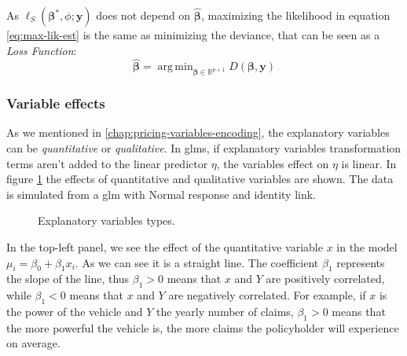 \documentclass[a4paper, twoside, openright, 12pt]{report}
\DeclareMathOperator*{\argmin}{arg\,min}  %
\theoremstyle{definition}
\theoremstyle{definition}
\theoremstyle{definition}
\theoremstyle{remark}
\begin{document}
As \(\ell_{S}\left(\boldsymbol{\beta}^*, \phi; \boldsymbol{y}\right)\) does not depend on \(\hat{\boldsymbol{\beta}}\), maximizing the likelihood in equation \eqref{eq:max-lik-est} is the same as minimizing the deviance, that can be seen as a \emph{Loss Function}:
\begin{equation}
\label{eq:max-lik-est-deviance}
\hat{\boldsymbol{\beta}} = \argmin_{\boldsymbol{\beta}\in\mathbb{R}^{p+1}}{D(\boldsymbol{\beta}, \boldsymbol{y})}
\end{equation}

\hypertarget{chap:var-effects}{%
\subsubsection{Variable effects}\label{chap:var-effects}}

As we mentioned in \ref{chap:pricing-variables-encoding}, the explanatory variables can be \emph{quantitative} or \emph{qualitative}. In \ac{glm}s, if explanatory variables transformation terms aren't added to the linear predictor \(\eta\), the variables effect on \(\eta\) is linear. In figure \ref{fig:expl-var-types} the effects of quantitative and qualitative variables are shown. The data is simulated from a \ac{glm} with Normal response and identity link.





\begin{figure}[!hbtp]

{\centering {}\newline{}

}

\caption{Explanatory variables types.}\label{fig:expl-var-types}
\end{figure}

In the top-left panel, we see the effect of the quantitative variable \(x\) in the model \(\mu_i = \beta_0 + \beta_1 x_i\). As we can see it is a straight line. The coefficient \(\beta_1\) represents the slope of the line, thus \(\beta_1>0\) means that \(x\) and \(Y\) are positively correlated, while \(\beta_1<0\) means that \(x\) and \(Y\) are negatively correlated. For example, if \(x\) is the power of the vehicle and \(Y\) the yearly number of claims, \(\beta_1>0\) means that the more powerful the vehicle is, the more claims the policyholder will experience on average.
\end{document}

